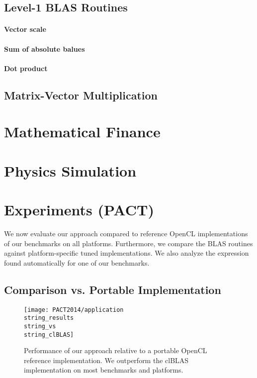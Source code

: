   \subsection{Level-1 BLAS Routines}

    \paragraph{Vector scale}

    \paragraph{Sum of absolute balues}

    \paragraph{Dot product}

  \subsection{Matrix-Vector Multiplication}

\section{Mathematical Finance}

\section{Physics Simulation}

\section{Experiments (PACT)}

We now evaluate our approach compared to reference OpenCL implementations of our benchmarks on all platforms.
Furthermore, we compare the BLAS routines against platform-specific tuned implementations.
We also analyze the expression found automatically for one of our benchmarks.




\subsection{Comparison vs. Portable Implementation}

\begin{figure}[t]
  \texttt{[image: PACT2014/application\\string\_results\\string\_vs\\string\_clBLAS]} 
  \caption{Performance of our approach relative to a portable OpenCL reference implementation.
           We outperform the clBLAS implementation on most benchmarks and platforms.}
  \label{fig:clblas}
\end{figure}

